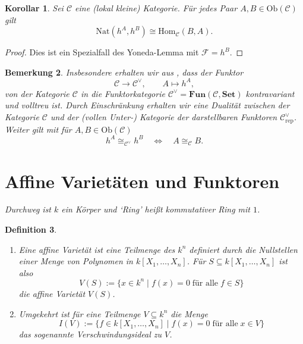 \documentclass[a4paper, 11pt]{scrartcl}
\newcommand{\Hom}{\text{Hom}}
\newcommand{\Ob}{\text{Ob}}
\newcommand{\CC}{\mathcal{C}}
\theoremstyle{basicstyle}
\newtheorem{definition}{Definition}[section]
\newtheorem{bemerkung}[definition]{Bemerkung}
\newtheorem{korollar}[definition]{Korollar}
\begin{document}
    \begin{korollar}\label{kor:1}
        Sei \(\mathcal{C}\) eine (lokal kleine) Kategorie.
        Für jedes Paar \(A, B \in \Ob(\mathcal{C})\) gilt %
        \[\text{Nat}(h^A, h^B) \cong \Hom_{\mathcal{C}}(B, A).\]
    \end{korollar}
    \begin{proof}
        Dies ist ein Spezialfall des Yoneda-Lemma mit \(\mathcal{F} = h^B\).
    \end{proof}

    \begin{bemerkung}\label{bem:2}
        Insbesondere erhalten wir aus , dass der Funktor
        \[\mathcal{C} \longrightarrow \mathcal{C}^\vee, \qquad A \mapsto h^A,\]
        von der Kategorie \(\mathcal{C}\) in die Funktorkategorie \(\mathcal{C}^\vee = \textbf{Fun}(\mathcal{C}, \textbf{Set})\) kontravariant und volltreu ist. %
        Durch Einschränkung erhalten wir eine Dualität zwischen der Kategorie \(\CC\) und der (vollen Unter-) Kategorie der darstellbaren Funktoren \(\CC_{\text{rep}}^\vee\).
        Weiter gilt mit  für \(A, B \in \Ob(\CC)\)
        \[h^A \cong_{\CC^\vee} h^B \quad\iff\quad A \cong_\CC B.\]
    \end{bemerkung}


    \section{Affine Varietäten und Funktoren}
    
    {\itshape Durchweg ist \(k\) ein Körper und `Ring' heißt kommutativer Ring mit \(1\).}
    
    \begin{definition}
        \begin{enumerate}
            \item Eine \emph{affine Varietät} ist eine Teilmenge des \(k^n\) definiert durch die Nullstellen einer Menge von Polynomen in \(k[X_1, \ldots, X_n]\).
                Für \(S \subseteq k[X_1, \ldots, X_n]\) ist also 
                \[V(S) := \{x \in k^n \;\vert\; f(x) = 0 \; \text{für alle}\; f \in S\}\]
                die affine Varietät \(V(S)\).

            \item Umgekehrt ist für eine Teilmenge \(V \subseteq k^n\) die Menge
                \[I(V) := \{f \in k[X_1, \ldots, X_n] \;\vert\; f(x) = 0 \;\text{für alle}\; x \in V\}\]
                das sogenannte \emph{Verschwindungsideal} zu \(V\).
        \end{enumerate}
    \end{definition}
\end{document}
